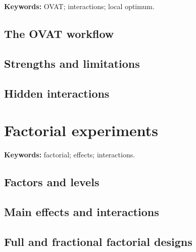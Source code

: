 \begin{warningbox}
\textbf{Keywords:} OVAT; interactions; local optimum.
\end{warningbox}

\subsection{The OVAT workflow}


\subsection{Strengths and limitations}


\subsection{Hidden interactions}


\section{Factorial experiments}

\begin{methodbox}
\textbf{Keywords:} factorial; effects; interactions.
\end{methodbox}

\subsection{Factors and levels}


\subsection{Main effects and interactions}


\subsection{Full and fractional factorial designs}

